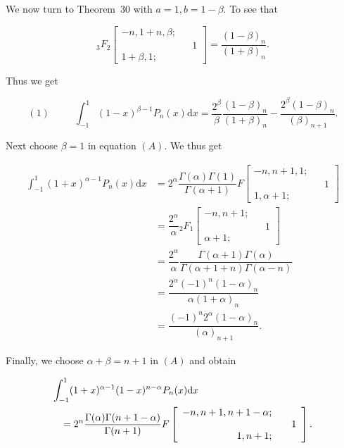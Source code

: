 \begin{solution}
We now turn to Theorem~30 with $a=1, b=1-\beta$. To see that

$${}_3F_2 \left[ \begin{array}{rlr}
-n, 1+n, \beta; & & \\
& & 1 \\
1+\beta, 1; & & 
\end{array} \right] = \dfrac{(1-\beta)_n}{(1+\beta)_n}.$$

Thus we get

$$(1) \hspace{30pt} \displaystyle\int_{-1}^1 (1-x)^{\beta-1} P_n(x) \mathrm{d}x = \dfrac{2^{\beta}}{\beta} \dfrac{(1-\beta)_n}{(1+\beta)_n} - \dfrac{2^{\beta} (1-\beta)_n}{(\beta)_{n+1}}.$$

Next choose $\beta=1$ in equation $(A)$. We thus get

$$\begin{array}{ll}
\displaystyle\int_{-1}^1 (1+x)^{\alpha-1} P_n(x) \mathrm{d}x &= 2^{\alpha} \dfrac{\Gamma(\alpha)\Gamma(1)}{\Gamma(\alpha+1)} F \left[ \begin{array}{rlr}
-n, n+1, 1; & & \\
& & 1 \\
1, \alpha+1; & &
\end{array} \right] \\
&= \dfrac{2^{\alpha}}{\alpha} {}_2F_1 \left[ \begin{array}{rlr}
-n,  n+1; & & \\
& & 1 \\
\alpha+1; & & 
\end{array} \right] \\
&= \dfrac{2^{\alpha}}{\alpha} \dfrac{\Gamma(\alpha+1) \Gamma(\alpha)}{\Gamma(\alpha+1+n)\Gamma(\alpha-n)} \\
&= \dfrac{2^{\alpha} (-1)^n (1-\alpha)_n}{\alpha (1+\alpha)_n} \\
&= \dfrac{(-1)^n 2^{\alpha} (1-\alpha)_n}{(\alpha)_{n+1}}.
\end{array}$$

Finally, we choose $\alpha+\beta=n+1$ in $(A)$ and obtain

\begin{eqnarray*}
\lefteqn{\displaystyle\int_{-1}^1 (1+x)^{\alpha-1} (1-x)^{n-\alpha} P_n(x) \mathrm{d}x} \\
& & = 2^n \dfrac{\Gamma(\alpha) \Gamma(n+1-\alpha)}{\Gamma(n+1)} F \left[ \begin{array}{rlr}
-n, n+1, n+1-\alpha; & & \\
& & 1 \\
1, n+1; & &
\end{array} \right].
\end{eqnarray*}


\end{solution}
